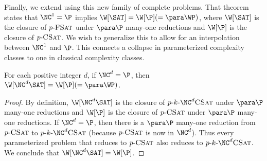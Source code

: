 

Finally, we extend \autocite[Corollary~3.7]{est15} using this new family of complete problems.
That theorem states that $\NC^1 = \P$ implies $\W[\SAT] = \W[\P] (= \para \WP)$, where $\W[\SAT]$ is the closure of $p \textnormal{-} \textsc{FSat}$ under $\para \P$ many-one reductions and $\W[\P]$ is the closure of $p \textnormal{-} \textsc{CSat}$.
We wish to generalize this to allow for an interpolation between $\NC^1$ and $\P$.
This connects a collapse in parameterized complexity classes to one in classical complexity classes.

\begin{corollary}
  For each positive integer $d$, if $\NC^d = \P$, then $\W[\NC^d \SAT] = \W[\P] (= \para \WP)$.
\end{corollary}
\begin{proof}
  By definition, $\W[\NC^d \SAT]$ is the closure of $\pNCSAT$ under $\para \P$ many-one reductions and $\W[\P]$ is the closure of $p \textnormal{-} \textsc{CSat}$ under $\para \P$ many-one reductions.
  If $\NC^d = \P$, then there is a $\para \P$ many-one reduction from $p \textnormal{-} \textsc{CSat}$ to $\pNCSAT$ (because $p \textnormal{-} \textsc{CSat}$ is now in $\NC^d$).
  Thus every parameterized problem that reduces to $p \textnormal{-} \textsc{CSat}$ also reduces to $\pNCSAT$.
  We conclude that $\W[\NC^d \SAT] = \W[\P]$.
\end{proof}


